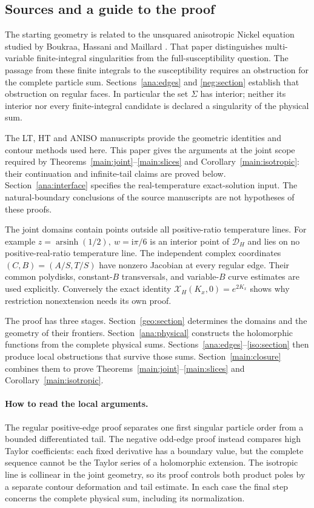 \documentclass[11pt]{article}
\numberwithin{equation}{section}
\theoremstyle{definition}
\newcommand{\ii}{\mathrm i}
\renewcommand{\DH}{\mathcal D_H}
\newcommand{\XH}{\mathcal X_H}
\begin{document}
\subsection{Sources and a guide to the proof}

The starting geometry is related to the unsquared anisotropic Nickel
equation studied by Boukraa, Hassani and Maillard
\cite[Section 6]{BHM}. That paper distinguishes multi-variable
finite-integral singularities from the full-susceptibility question.
The passage from these finite integrals to the susceptibility requires
an obstruction for the complete particle sum. Sections~\ref{ana:edges}
and \ref{neg:section} establish that obstruction on regular faces. In particular the set \(\Sigma\) has
interior; neither its interior nor every finite-integral candidate is
declared a singularity of the physical sum.

The LT, HT and ANISO manuscripts \cite{LTsource,HTsource,ANISOsource}
provide the geometric identities and contour methods used here.
This paper gives the arguments at the joint scope required by
Theorems~\ref{main:joint}--\ref{main:slices} and
Corollary~\ref{main:isotropic}: their continuation and infinite-tail
claims are proved below. Section~\ref{ana:interface} specifies the
real-temperature exact-solution input. The natural-boundary conclusions
of the source manuscripts are not hypotheses of these proofs.

The joint domains contain points outside all positive-ratio
temperature lines. For example
\(z=\operatorname{arsinh}(1/2),\ w=\ii\pi/6\) is an interior point
of \(\DH\) and lies on no positive-real-ratio temperature line.
The independent complex coordinates \((C,B)=(A/S,T/S)\) have
nonzero Jacobian at every regular edge. Their common polydisks,
constant-\(B\) transversals, and variable-\(B\) curve estimates
are used explicitly. Conversely the exact identity
\(\XH(K_x,0)=e^{2K_x}\) shows why restriction nonextension needs
its own proof.

The proof has three stages. Section~\ref{geo:section} determines the
domains and the geometry of their frontiers.
Section~\ref{ana:physical} constructs the holomorphic functions from
the complete physical sums. Sections~\ref{ana:edges}--\ref{iso:section}
then produce local obstructions that survive those sums.
Section~\ref{main:closure} combines them to prove
Theorems~\ref{main:joint}--\ref{main:slices} and
Corollary~\ref{main:isotropic}.

\paragraph{How to read the local arguments.}
The regular positive-edge proof separates one first singular particle
order from a bounded differentiated tail. The negative odd-edge proof
instead compares high Taylor coefficients: each fixed derivative has a
boundary value, but the complete sequence cannot be the Taylor series
of a holomorphic extension. The isotropic line is collinear in the
joint geometry, so its proof controls both product poles by a separate
contour deformation and tail estimate. In each case the final step
concerns the complete physical sum, including its normalization.
\end{document}
